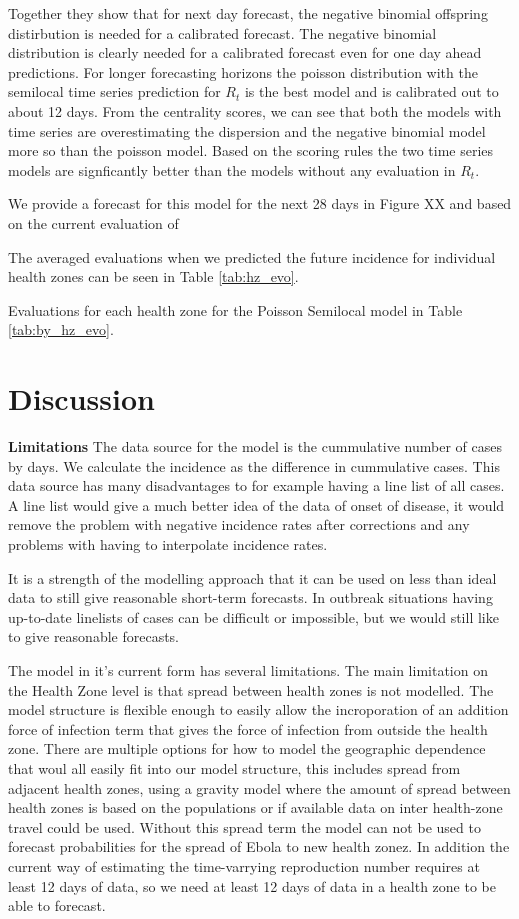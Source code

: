 \documentclass[12pt]{article}
\begin{document}
Together they show that for next day forecast, the negative binomial offspring distirbution is needed for a calibrated forecast. The negative binomial distribution is clearly needed for a calibrated forecast even for one day ahead predictions. For longer forecasting horizons the poisson distribution with the semilocal time series prediction for $R_t$ is the best model and is calibrated out to about 12 days. From the centrality scores, we can see that both the models with time series are overestimating the dispersion and the negative binomial model more so than the poisson model. Based on the scoring rules the two time series models are signficantly better than the models without any evaluation in $R_t$.

We provide a forecast for this model for the next 28 days in Figure XX and based on the current evaluation of 

The averaged evaluations when we predicted the future incidence for individual health zones can be seen in Table \ref{tab:hz_evo}.


Evaluations for each health zone for the Poisson Semilocal model in Table \ref{tab:by_hz_evo}.



\section{Discussion}




{\bf Limitations}
The data source for the model is the cummulative number of cases by days. We calculate the incidence as the difference in cummulative cases. This data source has many disadvantages to for example having a line list of all cases. A line list would give a much better idea of the data of onset of disease, it would remove the problem with negative incidence rates after corrections and any problems with having to interpolate incidence rates.

It is a strength of the modelling approach that it can be used on less than ideal data to still give reasonable short-term forecasts. In outbreak situations having up-to-date linelists of cases can be difficult or impossible, but we would still like to give reasonable forecasts. 

The model in it's current form has several limitations. The main limitation on the Health Zone level is that spread between health zones is not modelled. The model structure is flexible enough to easily allow the incroporation of an addition force of infection term that gives the force of infection from outside the health zone. There are multiple options for how to model the geographic dependence that woul all easily fit into our model structure, this includes spread from adjacent health zones, using a gravity model where the amount of spread between health zones is based on the populations or if available data on inter health-zone travel could be used. Without this spread term the model can not be used to forecast probabilities for the spread of Ebola to new health zonez. In addition the current way of estimating the time-varrying reproduction number requires at least 12 days of data, so we need at least 12 days of data in a health zone to be able to forecast.
\end{document}
